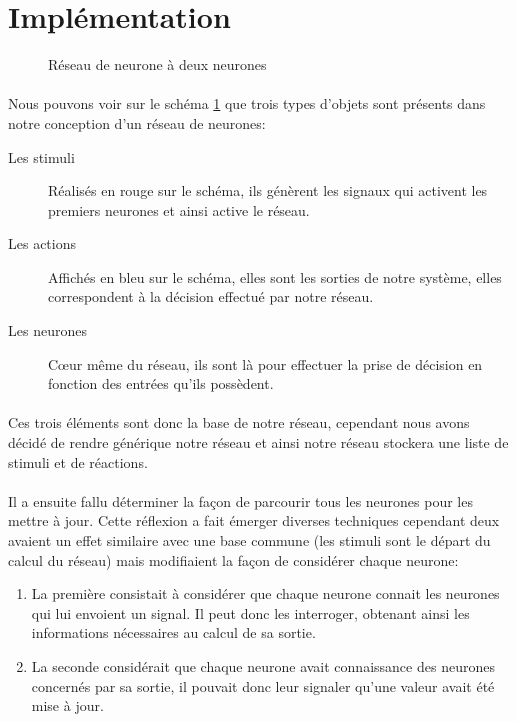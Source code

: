 \section{Implémentation}

\begin{figure}[ht]
  \centering
  
  \caption{Réseau de neurone à deux neurones}
  \label{graphInit}
\end{figure}

\paragraph{}
Nous pouvons voir sur le schéma \ref{graphInit} que trois types d'objets sont
présents dans notre conception d'un réseau de neurones:\\
\begin{description}
  \item[Les stimuli] Réalisés en rouge sur le schéma, ils génèrent les signaux
    qui activent les premiers neurones et ainsi active le réseau.
  \item[Les actions] Affichés en bleu sur le schéma, elles sont les sorties de
    notre système, elles correspondent à la décision effectué par notre réseau.
  \item[Les neurones] Cœur même du réseau, ils sont là pour effectuer la prise
    de décision en fonction des entrées qu'ils possèdent.
\end{description}

\paragraph{}
Ces trois éléments sont donc la base de notre réseau, cependant nous avons
décidé de rendre générique notre réseau et ainsi notre réseau stockera une liste
de stimuli et de réactions.

\paragraph{}
Il a ensuite fallu déterminer la façon de parcourir tous les neurones pour les
mettre à jour. Cette réflexion a fait émerger diverses techniques cependant deux
avaient un effet similaire avec une base commune (les stimuli sont le départ du
calcul du réseau) mais modifiaient la façon de considérer chaque
neurone:\\

\begin{enumerate}
  \item La première consistait à considérer que chaque neurone connait les
    neurones qui lui envoient un signal. Il peut donc les interroger, obtenant
    ainsi les informations nécessaires au calcul de sa sortie.
  \item La seconde considérait que chaque neurone avait connaissance des neurones
    concernés par sa sortie, il pouvait donc leur signaler qu'une valeur avait
    été mise à jour.
\end{enumerate}

